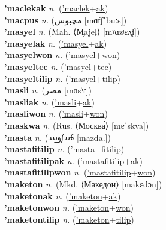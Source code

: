 \textbf{'maclekak} \textit{n.} (\hyperref['maclek]{'maclek}+\hyperref[ak]{ak})
 \label{'maclekak} \\
\textbf{'macpus} \textit{n.} ({\arabics{}مچبوس} [mɑt͡ʃˈbuːs])
 \label{'macpus} \\
\textbf{'masyel} \textit{n.} (Mah. ⟨M̧ajeļ⟩ [mˠɑzʲɛʌ̯ɫ])
 \label{'masyel} \\
\textbf{'masyelak} \textit{n.} (\hyperref['masyel]{'masyel}+\hyperref[ak]{ak})
 \label{'masyelak} \\
\textbf{'masyelwon} \textit{n.} (\hyperref['masyel]{'masyel}+\hyperref[won]{won})
 \label{'masyelwon} \\
\textbf{'masyeltec} \textit{n.} (\hyperref['masyel]{'masyel}+\hyperref[tec]{tec})
 \label{'masyeltec} \\
\textbf{'masyeltilip} \textit{n.} (\hyperref['masyel]{'masyel}+\hyperref[tilip]{tilip})
 \label{'masyeltilip} \\
\textbf{'masli} \textit{n.} ({\arabics{}مصر} [mɑsˁɾ])
 \label{'masli} \\
\textbf{'masliak} \textit{n.} (\hyperref['masli]{'masli}+\hyperref[ak]{ak})
 \label{'masliak} \\
\textbf{'masliwon} \textit{n.} (\hyperref['masli]{'masli}+\hyperref[won]{won})
 \label{'masliwon} \\
\textbf{'maskwa} \textit{n.} (Rus. ⟨Москва́⟩ [mɐˈskva])
 \label{'maskwa} \\
\textbf{'masta} \textit{n.} ({\avestan{}𐬨𐬀𐬰𐬛𐬁} [mazdaː])
 \label{'masta} \\
\textbf{'mastafitilip} \textit{n.} (\hyperref['masta]{'masta}+\hyperref[fitilip]{fitilip})
 \label{'mastafitilip} \\
\textbf{'mastafitilipak} \textit{n.} (\hyperref['mastafitilip]{'mastafitilip}+\hyperref[ak]{ak})
 \label{'mastafitilipak} \\
\textbf{'mastafitilipwon} \textit{n.} (\hyperref['mastafitilip]{'mastafitilip}+\hyperref[won]{won})
 \label{'mastafitilipwon} \\
\textbf{'maketon} \textit{n.} (Mkd. ⟨Македон⟩ [makɛdɔn])
 \label{'maketon} \\
\textbf{'maketonak} \textit{n.} (\hyperref['maketon]{'maketon}+\hyperref[ak]{ak})
 \label{'maketonak} \\
\textbf{'maketonwon} \textit{n.} (\hyperref['maketon]{'maketon}+\hyperref[won]{won})
 \label{'maketonwon} \\
\textbf{'maketontilip} \textit{n.} (\hyperref['maketon]{'maketon}+\hyperref[tilip]{tilip})
 \label{'maketontilip} \\
